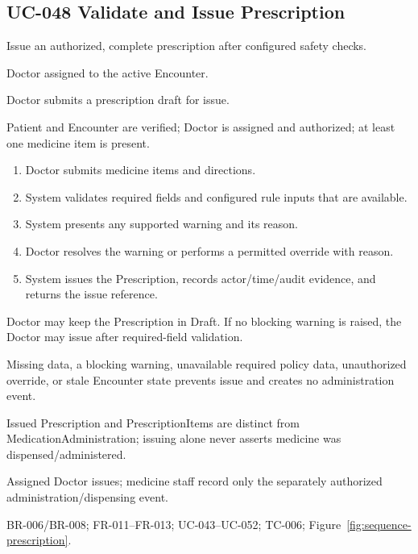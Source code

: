 \subsection{UC-048 Validate and Issue Prescription}
\begin{description}[leftmargin=2.6cm,style=nextline]
\item[Goal] Issue an authorized, complete prescription after configured safety checks.
\item[Primary actor] Doctor assigned to the active Encounter.
\item[Trigger] Doctor submits a prescription draft for issue.
\item[Preconditions] Patient and Encounter are verified; Doctor is assigned and authorized; at least one medicine item is present.
\item[Main success flow]
\begin{enumerate}[leftmargin=1.4em]
  \item Doctor submits medicine items and directions.
  \item System validates required fields and configured rule inputs that are available.
  \item System presents any supported warning and its reason.
  \item Doctor resolves the warning or performs a permitted override with reason.
  \item System issues the Prescription, records actor/time/audit evidence, and returns the issue reference.
\end{enumerate}
\item[Alternative flows] Doctor may keep the Prescription in Draft. If no blocking warning is raised, the Doctor may issue after required-field validation.
\item[Exception flows] Missing data, a blocking warning, unavailable required policy data, unauthorized override, or stale Encounter state prevents issue and creates no administration event.
\item[Postconditions and data] Issued Prescription and PrescriptionItems are distinct from MedicationAdministration; issuing alone never asserts medicine was dispensed/administered.
\item[Authorization] Assigned Doctor issues; medicine staff record only the separately authorized administration/dispensing event.
\item[Trace] BR-006/BR-008; FR-011--FR-013; UC-043--UC-052; TC-006; Figure~\ref{fig:sequence-prescription}.
\end{description}

